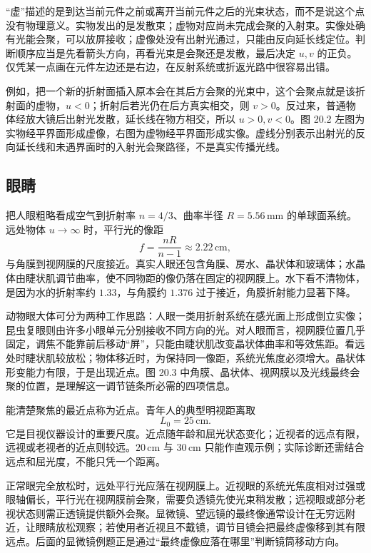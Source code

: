 “虚”描述的是到达当前元件之前或离开当前元件之后的光束状态，而不是说这个点没有物理意义。实物发出的是发散束；虚物对应尚未完成会聚的入射束。实像处确有光能会聚，可以放屏接收；虚像处没有出射光通过，只能由反向延长线定位。判断顺序应当是先看箭头方向，再看光束是会聚还是发散，最后决定 $u,v$ 的正负。仅凭某一点画在元件左边还是右边，在反射系统或折返光路中很容易出错。

例如，把一个新的折射面插入原本会在其后方会聚的光束中，这个会聚点就是该折射面的虚物，$u<0$；折射后若光仍在后方真实相交，则 $v>0$。反过来，普通物体经放大镜后出射光发散，延长线在物方相交，所以 $u>0,v<0$。图 20.2 左图为实物经平界面形成虚像，右图为虚物经平界面形成实像。虚线分别表示出射光的反向延长线和未遇界面时的入射光会聚路径，不是真实传播光线。

\subsection*{眼睛}

把人眼粗略看成空气到折射率 $n=4/3$、曲率半径 $R=5.56\,\mathrm{mm}$ 的单球面系统。远处物体 $u\to\infty$ 时，平行光的像距
\begin{equation}
 f=\frac{nR}{n-1}\approx2.22\,\mathrm{cm},
\end{equation}
与角膜到视网膜的尺度接近。真实人眼还包含角膜、房水、晶状体和玻璃体；水晶体由睫状肌调节曲率，使不同物距的像仍落在固定的视网膜上。水下看不清物体，是因为水的折射率约 $1.33$，与角膜约 $1.376$ 过于接近，角膜折射能力显著下降。

动物眼大体可分为两种工作思路：人眼一类用折射系统在感光面上形成倒立实像；昆虫复眼则由许多小眼单元分别接收不同方向的光。对人眼而言，视网膜位置几乎固定，调焦不能靠前后移动“屏”，只能由睫状肌改变晶状体曲率和等效焦距。看远处时睫状肌较放松；物体移近时，为保持同一像距，系统光焦度必须增大。晶状体形变能力有限，于是出现近点。图 20.3 中角膜、晶状体、视网膜以及光线最终会聚的位置，是理解这一调节链条所必需的四项信息。

\EyePanel

能清楚聚焦的最近点称为近点。青年人的典型明视距离取
\begin{equation}
 L_0=25\,\mathrm{cm}.
\end{equation}
它是目视仪器设计的重要尺度。近点随年龄和屈光状态变化；近视者的远点有限，远视或老视者的近点则较远。$20\,\mathrm{cm}$ 与 $30\,\mathrm{cm}$ 只能作直观示例；实际诊断还需结合远点和屈光度，不能只凭一个距离。

正常眼完全放松时，远处平行光应落在视网膜上。近视眼的系统光焦度相对过强或眼轴偏长，平行光在视网膜前会聚，需要负透镜先使光束稍发散；远视眼或部分老视状态则需正透镜提供额外会聚。显微镜、望远镜的最终像通常设计在无穷远附近，让眼睛放松观察；若使用者近视且不戴镜，调节目镜会把最终虚像移到其有限远点。后面的显微镜例题正是通过“最终虚像应落在哪里”判断镜筒移动方向。

